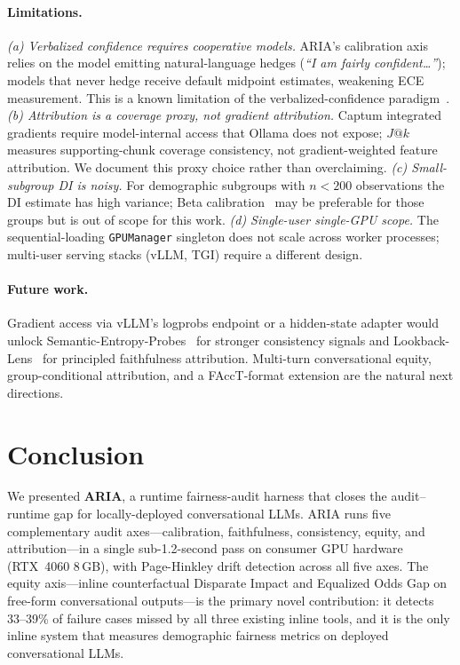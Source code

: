 \documentclass{article}
\begin{document}
\paragraph{Limitations.}
\noindent\textit{(a) Verbalized confidence requires cooperative models.}
ARIA's calibration axis relies on the model emitting natural-language
hedges (\emph{``I am fairly confident\ldots''}); models that never hedge
receive default midpoint estimates, weakening ECE measurement.
This is a known limitation of the verbalized-confidence
paradigm~\citep{tian2023justask}.
\noindent\textit{(b) Attribution is a coverage proxy, not gradient
attribution.}
Captum integrated gradients require model-internal access that Ollama
does not expose; $J@k$ measures supporting-chunk coverage consistency,
not gradient-weighted feature attribution.
We document this proxy choice rather than overclaiming.
\noindent\textit{(c) Small-subgroup DI is noisy.}
For demographic subgroups with $n < 200$ observations the DI estimate
has high variance; Beta calibration~\citep{kull2017beta} may be
preferable for those groups but is out of scope for this work.
\noindent\textit{(d) Single-user single-GPU scope.}
The sequential-loading \texttt{GPUManager} singleton does not scale
across worker processes; multi-user serving stacks (vLLM, TGI) require a
different design.

\paragraph{Future work.}
Gradient access via vLLM's logprobs endpoint or a hidden-state adapter
would unlock Semantic-Entropy-Probes~\citep{kossen2024probes} for
stronger consistency signals and
Lookback-Lens~\citep{chuang2024lookback} for principled faithfulness
attribution.
Multi-turn conversational equity, group-conditional attribution, and a
FAccT-format extension are the natural next directions.

\section{Conclusion}
\label{sec:conclusion}

We presented \textbf{ARIA}, a runtime fairness-audit harness that closes
the audit--runtime gap for locally-deployed conversational LLMs.
ARIA runs five complementary audit axes---calibration, faithfulness,
consistency, equity, and attribution---in a single sub-1.2-second pass on
consumer GPU hardware (RTX~4060 8\,GB), with Page-Hinkley drift detection
across all five axes.
The equity axis---inline counterfactual Disparate Impact and Equalized
Odds Gap on free-form conversational outputs---is the primary novel
contribution: it detects 33--39\% of failure cases missed by all three
existing inline tools, and it is the only inline system that measures
demographic fairness metrics on deployed conversational LLMs.
\end{document}
